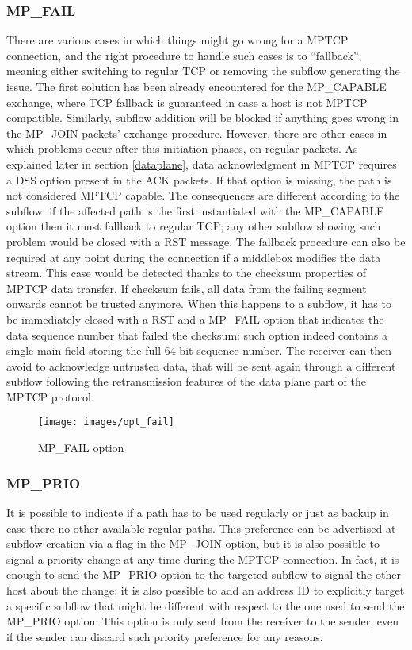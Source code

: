 \subsubsection{MP\_FAIL}
There are various cases in which things might go wrong for a MPTCP connection, and the right procedure to handle such cases is to ``fallback'', meaning either switching to regular TCP or removing the subflow generating the issue. The first solution has been already encountered for the MP\_CAPABLE exchange, where TCP fallback is guaranteed in case a host is not MPTCP compatible. Similarly, subflow addition will be blocked if anything goes wrong in the MP\_JOIN packets' exchange procedure. However, there are other cases in which problems occur after this initiation phases, on regular packets.
As explained later in section \ref{dataplane}, data acknowledgment in MPTCP requires a DSS option present in the ACK packets. If that option is missing, the path is not considered MPTCP capable. The consequences are different according to the subflow: if the affected path is the first instantiated with the MP\_CAPABLE option then it must fallback to regular TCP; any other subflow showing such problem would be closed with a RST message.
The fallback procedure can also be required at any point during the connection if a middlebox modifies the data stream. This case would be detected thanks to the checksum properties of MPTCP data transfer. If checksum fails, all data from the failing segment onwards cannot be trusted anymore. When this happens to a subflow, it has to be immediately closed with a RST and a MP\_FAIL option that indicates the data sequence number that failed the checksum: such option indeed contains a single main field storing the full 64-bit sequence number. The receiver can then avoid to acknowledge untrusted data, that will be sent again through a different subflow following the retransmission features of the data plane part of the MPTCP protocol.

\begin{figure}[!htb]
\centering
\texttt{[image: images/opt\_fail]}
\caption{MP\_FAIL option}
\label{fig:opt_fail}
\end{figure}

\subsubsection{MP\_PRIO}
It is possible to indicate if a path has to be used regularly or just as backup in case there no other available regular paths. This preference can be advertised at subflow creation via a flag in the MP\_JOIN option, but it is also possible to signal a priority change at any time during the MPTCP connection. In fact, it is enough to send the MP\_PRIO option to the targeted subflow to signal the other host about the change; it is also possible to add an address ID to explicitly target a specific subflow that might be different with respect to the one used to send the MP\_PRIO option. This option is only sent from the receiver to the sender, even if the sender can discard such priority preference for any reasons.

